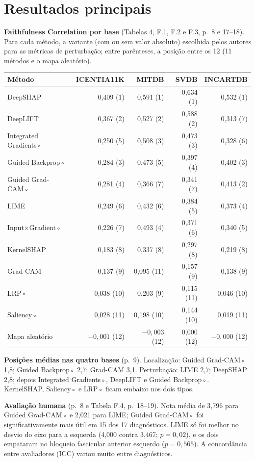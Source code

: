 \documentclass[11pt,a4paper]{article}
\begin{document}
\section{Resultados principais}
\textbf{Faithfulness Correlation por base} (Tabelas 4, F.1, F.2 e F.3, p.~8 e 17--18). Para cada método, a variante (com ou sem valor absoluto) escolhida pelos autores para as métricas de perturbação; entre parênteses, a posição entre os 12 (11 métodos e o mapa aleatório).
\begin{center}\small
\begin{tabular}{lrrrr}
\toprule
\textbf{Método} & \textbf{ICENTIA11K} & \textbf{MITDB} & \textbf{SVDB} & \textbf{INCARTDB} \\
\midrule
DeepSHAP           & 0,409 (1)  & 0,591 (1)  & 0,634 (1)  & 0,532 (1) \\
DeepLIFT           & 0,367 (2)  & 0,527 (2)  & 0,588 (2)  & 0,313 (7) \\
Integrated Gradients◦ & 0,250 (5) & 0,508 (3) & 0,473 (3) & 0,328 (6) \\
Guided Backprop◦   & 0,284 (3)  & 0,473 (5)  & 0,397 (4)  & 0,402 (3) \\
Guided Grad-CAM◦   & 0,281 (4)  & 0,366 (7)  & 0,341 (7)  & 0,413 (2) \\
LIME               & 0,249 (6)  & 0,432 (6)  & 0,384 (5)  & 0,373 (4) \\
Input×Gradient◦    & 0,226 (7)  & 0,493 (4)  & 0,371 (6)  & 0,340 (5) \\
KernelSHAP         & 0,183 (8)  & 0,337 (8)  & 0,297 (8)  & 0,219 (8) \\
Grad-CAM           & 0,137 (9)  & 0,095 (11) & 0,157 (9)  & 0,138 (9) \\
LRP◦               & 0,038 (10) & 0,203 (9)  & 0,115 (11) & 0,046 (10) \\
Saliency◦          & 0,028 (11) & 0,198 (10) & 0,144 (10) & 0,019 (11) \\
Mapa aleatório     & $-0{,}001$ (12) & $-0{,}003$ (12) & 0,000 (12) & $-0{,}000$ (12) \\
\bottomrule
\end{tabular}
\end{center}
\textbf{Posições médias nas quatro bases} (p.~9). Localização: Guided Grad-CAM◦ 1,8; Guided Backprop◦ 2,7; Grad-CAM 3,1. Perturbação: LIME 2,7; DeepSHAP 2,8; depois Integrated Gradients◦, DeepLIFT e Guided Backprop◦. KernelSHAP, Saliency◦ e LRP◦ ficam embaixo nos dois tipos.

\textbf{Avaliação humana} (p.~8 e Tabela F.4, p.~18--19). Nota média de 3,796 para Guided Grad-CAM◦ e 2,021 para LIME; Guided Grad-CAM◦ foi significativamente mais útil em 15 dos 17 diagnósticos. LIME só foi melhor no desvio do eixo para a esquerda (4,000 contra 3,467; $p = 0{,}02$), e os dois empataram no bloqueio fascicular anterior esquerdo ($p = 0{,}565$). A concordância entre avaliadores (ICC) variou muito entre diagnósticos.
\end{document}
